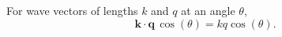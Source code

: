 \documentclass{article}
\begin{document}
For wave vectors of lengths $k$ and $q$ at an angle $\theta$,
\begin{equation}
\mathbf{k}\cdot\mathbf{q}\,\cos(\theta) = k q \cos(\theta) .
\label{eq:kq}
\end{equation}
\end{document}
